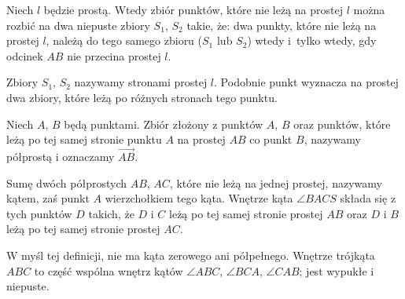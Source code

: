 \begin{proposition}
    Niech $l$ będzie prostą.
    Wtedy zbiór punktów, które nie leżą na prostej $l$ można rozbić na dwa niepuste zbiory $S_1$, $S_2$ takie, że: dwa punkty, które nie leżą na prostej $l$, należą do tego samego zbioru ($S_1$ lub $S_2$) wtedy i~tylko wtedy, gdy odcinek $AB$ nie przecina prostej $l$.
\end{proposition} %

Zbiory $S_1$, $S_2$ nazywamy stronami prostej $l$.
Podobnie punkt wyznacza na prostej dwa zbiory, które leżą po różnych stronach tego punktu.

\begin{definition}[półprosta]
    Niech $A$, $B$ będą punktami.
    Zbiór złożony z punktów $A$, $B$ oraz punktów, które leżą po tej samej stronie punktu $A$ na prostej $AB$ co punkt $B$, nazywamy półprostą i oznaczamy $\overrightarrow{AB}$.
\end{definition} %

\begin{definition}[kąt]
    Sumę dwóch półprostych $AB$, $AC$, które nie leżą na jednej prostej, nazywamy kątem, zaś punkt $A$ wierzchołkiem tego kąta.
    Wnętrze kąta $\angle BACS$ składa się z tych punktów $D$ takich, że $D$ i $C$ leżą po tej samej stronie prostej $AB$ oraz $D$ i $B$ leżą po tej samej stronie prostej $AC$.
\end{definition} %

W myśl tej definicji, nie ma kąta zerowego ani półpełnego.
Wnętrze trójkąta $ABC$ to część wspólna wnętrz kątów $\angle ABC$, $\angle BCA$, $\angle CAB$; jest wypukłe i niepuste.

%